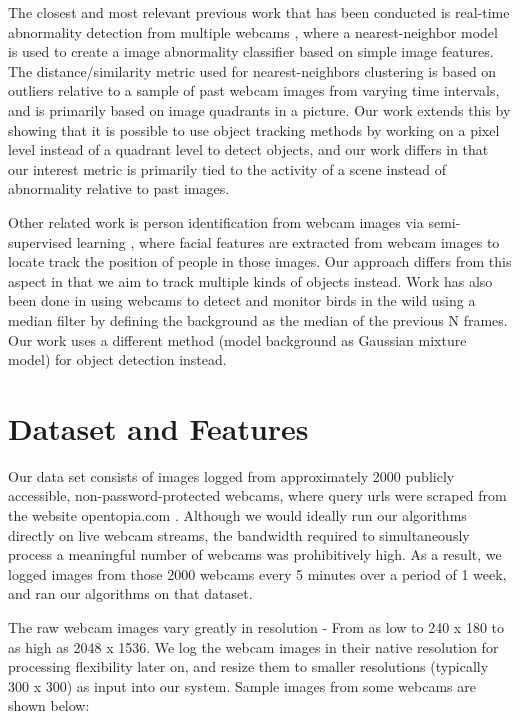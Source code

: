 \documentclass[10pt]{article} %
\begin{document}
The closest and most relevant previous work that has been conducted is real-time abnormality detection from multiple webcams \cite{huntingnessie}, where a nearest-neighbor model is used to create a image abnormality classifier based on simple image features. The distance/similarity metric used for nearest-neighbors clustering is based on outliers relative to a sample of past webcam images from varying time intervals, and is primarily based on image quadrants in a picture. Our work extends this by showing that it is possible to use object tracking methods by working on a pixel level instead of a quadrant level to detect objects, and our work differs in that our interest metric is primarily tied to the activity of a scene instead of abnormality relative to past images. 

Other related work is person identification from webcam images via semi-supervised learning \cite{personidentification}, where facial features are extracted from webcam images to locate track the position of people in those images. Our approach differs from this aspect in that we aim to track multiple kinds of objects instead. Work has also been done in using webcams to detect and monitor birds in the wild \cite{birddetection} using a median filter by defining the background as the median of the previous N frames. Our work uses a different method (model background as Gaussian mixture model) for object detection instead. 

\section{Dataset and Features}
Our data set consists of images logged from approximately 2000 publicly accessible, non-password-protected webcams, where query urls were scraped from the website opentopia.com \cite{opentopia}. Although we would ideally run our algorithms directly on live webcam streams, the bandwidth required to simultaneously process a meaningful number of webcams was prohibitively high. As a result, we logged images from those 2000 webcams every 5 minutes over a period of 1 week, and ran our algorithms on that dataset. 

The raw webcam images vary greatly in resolution - From as low to 240 x 180 to as high as 2048 x 1536. We log the webcam images in their native resolution for processing flexibility later on, and resize them to smaller resolutions (typically 300 x 300) as input into our system. Sample images from some webcams are shown below:
\end{document}
